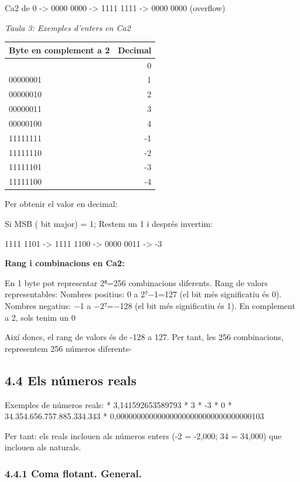 \documentclass[
  12 pt,
  a4paper,
]{article}
\begin{document}
Ca2 de 0 -\textgreater{} 0000 0000 -\textgreater{} 1111 1111
-\textgreater{} 0000 0000 (overflow)

\emph{Taula 3: Exemples d'enters en Ca2}

\begin{longtable}[]{@{}lr@{}}
\toprule\noalign{}
Byte en complement a 2 & Decimal \\
\midrule\noalign{}
\endhead
\bottomrule\noalign{}
\endlastfoot
00000000 & 0 \\
00000001 & 1 \\
00000010 & 2 \\
00000011 & 3 \\
00000100 & 4 \\
11111111 & -1 \\
11111110 & -2 \\
11111101 & -3 \\
11111100 & -4 \\
\end{longtable}

Per obtenir el valor en decimal:

Si MSB ( bit major) = 1; Restem un 1 i després invertim:

1111 1101 -\textgreater{} 1111 1100 -\textgreater{} 0000 0011
-\textgreater{} -3

\textbf{Rang i combinacions en Ca2:}

En 1 byte pot representar 2⁸=256 combinacions diferents. Rang de valors
representables: Nombres positius: 0 a 2⁷−1=127 (el bit més significatiu
és 0). Nombres negatius: −1 a −2⁷=−128 (el bit més significatiu és 1).
En complement a 2, sols tenim un 0

Així doncs, el rang de valors és de -128 a 127. Per tant, les 256
combinacions, representem 256 números diferents-

\subsection{4.4 Els números reals}\label{els-nuxfameros-reals}

Exemples de números reals: * 3,141592653589793 * 3 * -3 * 0 *
34.354.656.757.885.334.343 * 0,000000000000000000000000000000000103

Per tant: els reals inclouen als números enters (-2 = -2,000; 34 =
34,000) que inclouen als naturals.

\subsubsection{4.4.1 Coma flotant.
General.}\label{coma-flotant.-general.}
\end{document}
